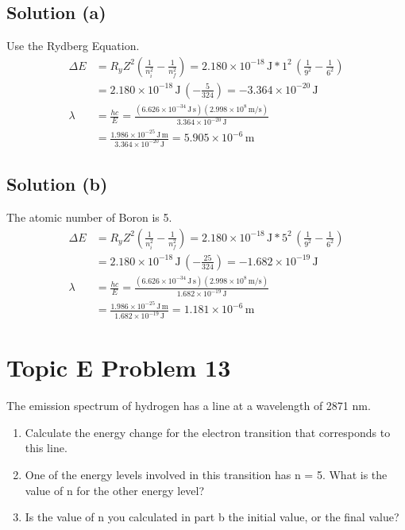 \documentclass[10pt]{article}
\newcommand{\E}[1]{\times 10^{#1}}
\begin{document}
        \subsection{Solution (a)}
            Use the Rydberg Equation.
            \begin{align}
                \Delta E    &=  R_y Z^2 \left( \frac{1}{n_i^2} - \frac{1}{n_f^2} \right)
                    =   2.180\E{-18}\,\unit{\joule} * 1^2\,\left( \frac{1}{9^2} - \frac{1}{6^2} \right)\\
                    &=  2.180\E{-18}\,\unit{\joule}\,\left( -\frac{5}{324} \right)
                    =   -3.364\E{-20}\,\unit{\joule}\\
                \lambda &=  \frac{hc}{E}
                    =   \frac{(6.626\E{-34}\,\unit{\joule\,\second})(2.998\E{8}\,\unit{\meter/\second})}{3.364\E{-20}\,\unit{\joule}}\\
                    &=  \frac{1.986\E{-25}\,\unit{\joule\,\meter}}{3.364\E{-20}\,\unit{\joule}}
                    =   \boxed{5.905\E{-6}\,\unit{\meter}}
            \end{align}

        \subsection{Solution (b)}
            The atomic number of Boron is 5.
            \begin{align}
                \Delta E    &=  R_y Z^2 \left( \frac{1}{n_i^2} - \frac{1}{n_f^2} \right)
                    =   2.180\E{-18}\,\unit{\joule} * 5^2\,\left( \frac{1}{9^2} - \frac{1}{6^2} \right)\\
                    &=  2.180\E{-18}\,\unit{\joule}\,\left( -\frac{25}{324} \right)
                    =   -1.682\E{-19}\,\unit{\joule}\\
                \lambda &=  \frac{hc}{E}
                    =   \frac{(6.626\E{-34}\,\unit{\joule\,\second})(2.998\E{8}\,\unit{\meter/\second})}{1.682\E{-19}\,\unit{\joule}}\\
                    &=  \frac{1.986\E{-25}\,\unit{\joule\,\meter}}{1.682\E{-19}\,\unit{\joule}}
                    =   \boxed{1.181\E{-6}\,\unit{\meter}}
            \end{align}

    \pagebreak
    \section{Topic E Problem 13}
        The emission spectrum of hydrogen has a line at a wavelength of 2871 nm.
        \begin{enumerate}[label=\alph*)]
            \item   Calculate the energy change for the electron transition that corresponds to this line.
            \item   One of the energy levels involved in this transition has n = 5. What is the value of n for the other energy level?
            \item   Is the value of n you calculated in part b the initial value, or the final value?
        \end{enumerate}
        
\end{document}
